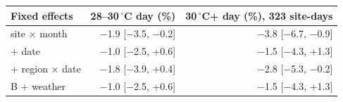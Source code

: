 \begin{tabular}{lrr}
\toprule
Fixed effects & 28--30\,$^\circ$C day (\%) & 30\,$^\circ$C+ day (\%), 323 site-days \\
\midrule
site × month & $-$1.9 [$-$3.5, $-$0.2] & $-$3.8 [$-$6.7, $-$0.9] \\
+ date & $-$1.0 [$-$2.5, +0.6] & $-$1.5 [$-$4.3, +1.3] \\
+ region × date & $-$1.8 [$-$3.9, +0.4] & $-$2.8 [$-$5.3, $-$0.2] \\
B + weather & $-$1.0 [$-$2.5, +0.6] & $-$1.5 [$-$4.3, +1.3] \\
\bottomrule
\end{tabular}
